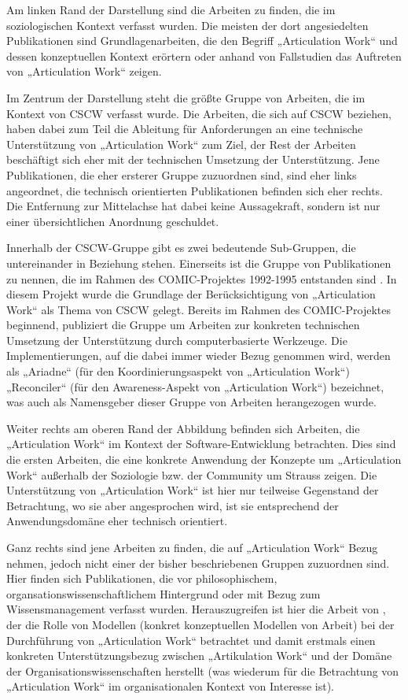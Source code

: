 Am linken Rand der Darstellung sind die Arbeiten zu finden, die im soziologischen Kontext verfasst wurden. Die meisten der dort angesiedelten Publikationen sind Grundlagenarbeiten, die den Begriff „Articulation Work“ und dessen konzeptuellen Kontext erörtern oder anhand von Fallstudien das Auftreten von „Articulation Work“ zeigen.

Im Zentrum der Darstellung steht die größte Gruppe von Arbeiten, die im Kontext von \gls{CSCW} verfasst wurde. Die Arbeiten, die sich auf \gls{CSCW} beziehen, haben dabei zum Teil die Ableitung für Anforderungen an eine technische Unterstützung von „Articulation Work“ zum Ziel, der Rest der Arbeiten beschäftigt sich eher mit der technischen Umsetzung der Unterstützung. Jene Publikationen, die eher ersterer Gruppe zuzuordnen sind, sind eher links angeordnet, die technisch orientierten Publikationen befinden sich eher rechts. Die Entfernung zur Mittelachse hat dabei keine Aussagekraft, sondern ist nur einer übersichtlichen Anordnung geschuldet. 

Innerhalb der \gls{CSCW}-Gruppe gibt es zwei bedeutende Sub-Gruppen, die untereinander in Beziehung stehen. Einerseits ist die Gruppe von Publikationen zu nennen, die im Rahmen des COMIC-Projektes 1992-1995 entstanden sind \citep{Rodden95}. In diesem Projekt wurde die Grundlage der Berücksichtigung von „Articulation Work“ als Thema von \gls{CSCW} gelegt. Bereits im Rahmen des COMIC-Projektes beginnend, publiziert die Gruppe um \citeauthor{Simone00} Arbeiten zur konkreten technischen Umsetzung der Unterstützung durch computerbasierte Werkzeuge. Die Implementierungen, auf die dabei immer wieder Bezug genommen wird, werden als „Ariadne“ (für den Koordinierungsaspekt von „Articulation Work“) „Reconciler“ (für den Awareness-Aspekt von „Articulation Work“) bezeichnet, was auch als Namensgeber dieser Gruppe von Arbeiten herangezogen wurde.

Weiter rechts am oberen Rand der Abbildung befinden sich Arbeiten, die „Articulation Work“ im Kontext der Software-Entwicklung betrachten. Dies sind die ersten Arbeiten, die eine konkrete Anwendung der Konzepte um „Articulation Work“ außerhalb der Soziologie bzw. der Community um Strauss zeigen. Die Unterstützung von „Articulation Work“ ist hier nur teilweise Gegenstand der Betrachtung, wo sie aber angesprochen wird, ist sie entsprechend der Anwendungsdomäne eher technisch orientiert.

Ganz rechts sind jene Arbeiten zu finden, die auf „Articulation Work“ Bezug nehmen, jedoch nicht einer der bisher beschriebenen Gruppen zuzuordnen sind. Hier finden sich Publikationen, die vor philosophischem, organsationswissenschaftlichem Hintergrund oder mit Bezug zum Wissensmanagement verfasst wurden. Herauszugreifen ist hier die Arbeit von \citet{Jorgensen04}, der die Rolle von Modellen (konkret konzeptuellen Modellen von Arbeit) bei der Durchführung von „Articulation Work“ betrachtet und damit erstmals einen konkreten Unterstützungsbezug zwischen „Artikulation Work“ und der Domäne der Organisationswissenschaften herstellt (was wiederum für die Betrachtung von „Articulation Work“ im organisationalen Kontext von Interesse ist).

